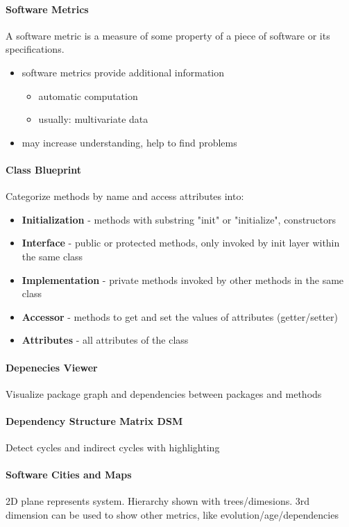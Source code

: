 \documentclass[10pt,a4paper]{article}
\begin{document}
	\paragraph{Software Metrics} A software metric is a measure of some property of a
	piece of software or its specifications.
	\begin{itemize}
		\item software metrics provide additional information
		\begin{itemize}
			\item automatic computation
			\item usually: multivariate data
		\end{itemize}
		\item may increase understanding, help to find problems
	\end{itemize}
	
	\paragraph{Class Blueprint}
	Categorize methods by name and access attributes into:
	\begin{itemize}
		\item \textbf{Initialization} - methods with substring "init" or "initialize", constructors
		\item \textbf{Interface} - public or protected methods, only invoked by init layer within the same class 
		\item \textbf{Implementation} - private methods invoked by other methods in the same class
		\item \textbf{Accessor} - methods to get and set the values of attributes (getter/setter)
		\item \textbf{Attributes} - all attributes of the class
	\end{itemize}
	
	\paragraph{Depenecies Viewer}
	Visualize package graph and dependencies between packages and methods
	
	\paragraph{Dependency Structure Matrix DSM}
	Detect cycles and indirect cycles with highlighting

	\paragraph{Software Cities and Maps}
	2D plane represents system. Hierarchy shown with trees/dimesions. 3rd dimension can be used to show other metrics, like evolution/age/dependencies
	
\end{document}
